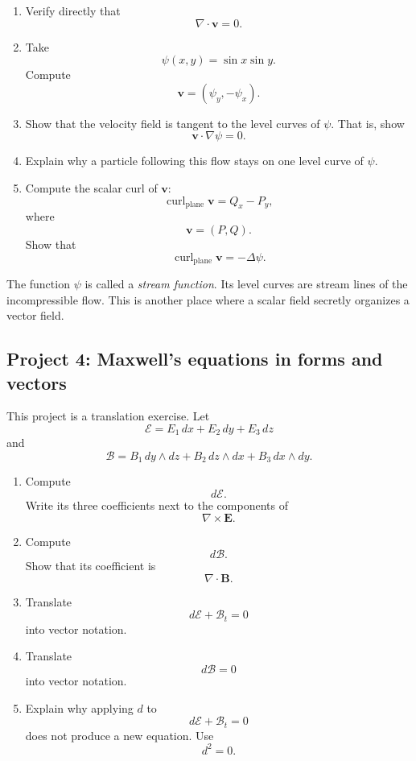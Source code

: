 \begin{enumerate}
\item Verify directly that
\[
    \nabla\cdot\mathbf v=0.
\]

\item Take
\[
    \psi(x,y)=\sin x\sin y.
\]
Compute
\[
    \mathbf v=(\psi_y,-\psi_x).
\]

\item Show that the velocity field is tangent to the level curves of \(\psi\).  That is,
show
\[
    \mathbf v\cdot\nabla\psi=0.
\]

\item Explain why a particle following this flow stays on one level curve of \(\psi\).

\item Compute the scalar curl of \(\mathbf v\):
\[
    \operatorname{curl}_{\mathrm{plane}}\mathbf v
    =
    Q_x-P_y,
\]
where
\[
    \mathbf v=(P,Q).
\]
Show that
\[
    \operatorname{curl}_{\mathrm{plane}}\mathbf v=-\Delta\psi.
\]
\end{enumerate}

The function \(\psi\) is called a \emph{stream function}.  Its level curves are stream
lines of the incompressible flow.  This is another place where a scalar field secretly
organizes a vector field.

\subsection{Project 4: Maxwell's equations in forms and vectors}

This project is a translation exercise.  Let
\[
    \mathcal E=E_1\,dx+E_2\,dy+E_3\,dz
\]
and
\[
    \mathcal B=B_1\,dy\wedge dz+B_2\,dz\wedge dx+B_3\,dx\wedge dy.
\]

\begin{enumerate}
\item Compute
\[
    d\mathcal E.
\]
Write its three coefficients next to the components of
\[
    \nabla\times\mathbf E.
\]

\item Compute
\[
    d\mathcal B.
\]
Show that its coefficient is
\[
    \nabla\cdot\mathbf B.
\]

\item Translate
\[
    d\mathcal E+\mathcal B_t=0
\]
into vector notation.

\item Translate
\[
    d\mathcal B=0
\]
into vector notation.

\item Explain why applying \(d\) to
\[
    d\mathcal E+\mathcal B_t=0
\]
does not produce a new equation.  Use
\[
    d^2=0.
\]
\end{enumerate}

